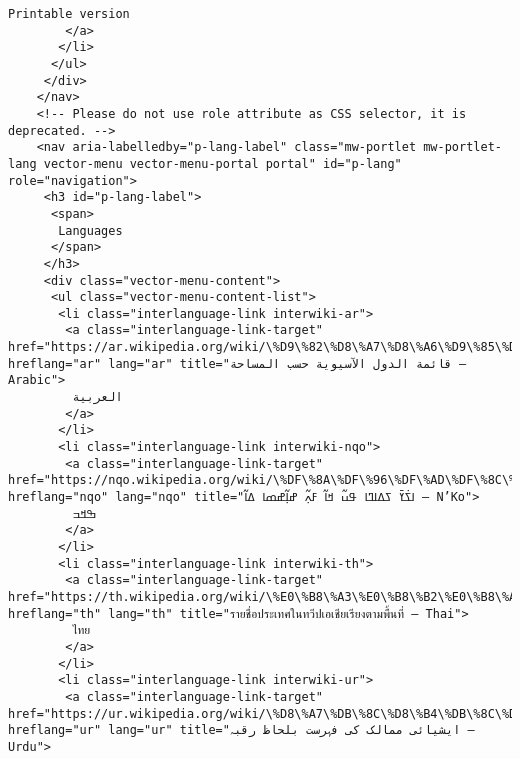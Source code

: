 \documentclass[11pt]{article}
\begin{document}
\begin{Verbatim}[commandchars=\\\{\}]
         Printable version
        </a>
       </li>
      </ul>
     </div>
    </nav>
    <!-- Please do not use role attribute as CSS selector, it is deprecated. -->
    <nav aria-labelledby="p-lang-label" class="mw-portlet mw-portlet-lang vector-menu vector-menu-portal portal" id="p-lang" role="navigation">
     <h3 id="p-lang-label">
      <span>
       Languages
      </span>
     </h3>
     <div class="vector-menu-content">
      <ul class="vector-menu-content-list">
       <li class="interlanguage-link interwiki-ar">
        <a class="interlanguage-link-target" href="https://ar.wikipedia.org/wiki/\%D9\%82\%D8\%A7\%D8\%A6\%D9\%85\%D8\%A9\_\%D8\%A7\%D9\%84\%D8\%AF\%D9\%88\%D9\%84\_\%D8\%A7\%D9\%84\%D8\%A2\%D8\%B3\%D9\%8A\%D9\%88\%D9\%8A\%D8\%A9\_\%D8\%AD\%D8\%B3\%D8\%A8\_\%D8\%A7\%D9\%84\%D9\%85\%D8\%B3\%D8\%A7\%D8\%AD\%D8\%A9" hreflang="ar" lang="ar" title="قائمة الدول الآسيوية حسب المساحة – Arabic">
         العربية
        </a>
       </li>
       <li class="interlanguage-link interwiki-nqo">
        <a class="interlanguage-link-target" href="https://nqo.wikipedia.org/wiki/\%DF\%8A\%DF\%96\%DF\%AD\%DF\%8C\%DF\%AB\_\%DF\%96\%DF\%A1\%DF\%8A\%DF\%A3\%DF\%8A\_\%DF\%9F\%DF\%8E\%DF\%AC\_\%DF\%9E\%DF\%8A\%DF\%AC\_\%DF\%93\%DF\%8D\%DF\%B2\%DF\%AC\_\%DF\%9D\%DF\%8A\%DF\%B2\%DF\%AC\%DF\%9D\%DF\%98\%DF\%8A\_\%DF\%A1\%DF\%8A\%DF\%AC" hreflang="nqo" lang="nqo" title="ߊߖ߭ߌ߫ ߖߡߊߣߊ ߟߎ߬ ߞߊ߬ ߓߍ߲߬ ߝߊ߲߬ߝߘߊ ߡߊ߬ – N’Ko">
         ߒߞߏ
        </a>
       </li>
       <li class="interlanguage-link interwiki-th">
        <a class="interlanguage-link-target" href="https://th.wikipedia.org/wiki/\%E0\%B8\%A3\%E0\%B8\%B2\%E0\%B8\%A2\%E0\%B8\%8A\%E0\%B8\%B7\%E0\%B9\%88\%E0\%B8\%AD\%E0\%B8\%9B\%E0\%B8\%A3\%E0\%B8\%B0\%E0\%B9\%80\%E0\%B8\%97\%E0\%B8\%A8\%E0\%B9\%83\%E0\%B8\%99\%E0\%B8\%97\%E0\%B8\%A7\%E0\%B8\%B5\%E0\%B8\%9B\%E0\%B9\%80\%E0\%B8\%AD\%E0\%B9\%80\%E0\%B8\%8A\%E0\%B8\%B5\%E0\%B8\%A2\%E0\%B9\%80\%E0\%B8\%A3\%E0\%B8\%B5\%E0\%B8\%A2\%E0\%B8\%87\%E0\%B8\%95\%E0\%B8\%B2\%E0\%B8\%A1\%E0\%B8\%9E\%E0\%B8\%B7\%E0\%B9\%89\%E0\%B8\%99\%E0\%B8\%97\%E0\%B8\%B5\%E0\%B9\%88" hreflang="th" lang="th" title="รายชื่อประเทศในทวีปเอเชียเรียงตามพื้นที่ – Thai">
         ไทย
        </a>
       </li>
       <li class="interlanguage-link interwiki-ur">
        <a class="interlanguage-link-target" href="https://ur.wikipedia.org/wiki/\%D8\%A7\%DB\%8C\%D8\%B4\%DB\%8C\%D8\%A7\%D8\%A6\%DB\%8C\_\%D9\%85\%D9\%85\%D8\%A7\%D9\%84\%DA\%A9\_\%DA\%A9\%DB\%8C\_\%D9\%81\%DB\%81\%D8\%B1\%D8\%B3\%D8\%AA\_\%D8\%A8\%D9\%84\%D8\%AD\%D8\%A7\%D8\%B8\_\%D8\%B1\%D9\%82\%D8\%A8\%DB\%81" hreflang="ur" lang="ur" title="ایشیائی ممالک کی فہرست بلحاظ رقبہ – Urdu">

\end{Verbatim}
\end{document}
